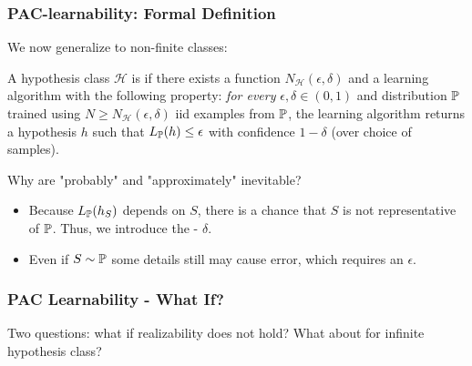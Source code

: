 \documentclass[11pt]{scrartcl}
\begin{document}
\subsubsection{PAC-learnability: Formal Definition}
We now generalize to non-finite classes:
\begin{defn}
A hypothesis class $\mathcal{H}$ is  if there exists a function $N_\mathcal{H}(\epsilon, \delta)$ and a learning algorithm with the following property: \textit{for every} $\epsilon, \delta \in (0,1)$ and distribution $\mathbb{P}$ trained using $N \ge N_{\mathcal{H}}(\epsilon,\delta)$ iid examples from $\mathbb{P}$, the learning algorithm returns a hypothesis $h$ such that $L_{\mathbb{P}}(h) \le \epsilon$ with confidence $1-\delta$ (over choice of samples).
\end{defn}

Why are "probably" and "approximately" inevitable? 
\begin{itemize}
    \item Because $L_{\mathbb{P}}(h_S)$ depends on $S$, there is a chance that $S$ is not representative of $\mathbb{P}$. Thus, we introduce the - $\delta$.
    \item Even if $S \sim \mathbb{P}$ some details still may cause error, which requires an  $\epsilon$.
\end{itemize}

\subsubsection{PAC Learnability - What If?}

Two questions: what if realizability does not hold? What about for infinite hypothesis class?
\end{document}
